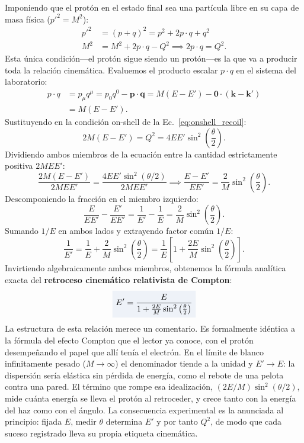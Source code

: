 \documentclass[10pt,a4paper]{article}
\newcommand{\dest}[1]{{\setlength{\fboxsep}{4pt}\colorbox{colordest}{$\displaystyle #1$}}}
\begin{document}
Imponiendo que el protón en el estado final sea una partícula libre en su capa de masa física ($p'^2 = M^2$):
\begin{align}
p'^2 &= (p + q)^2 = p^2 + 2 p \cdot q + q^2 \nonumber \\
M^2 &= M^2 + 2 p \cdot q - Q^2 \implies 2 p \cdot q = Q^2.
\label{eq:onshell_recoil}
\end{align}
Esta única condición---el protón sigue siendo un protón---es la que va a producir toda la relación cinemática. Evaluemos el producto escalar $p \cdot q$ en el sistema del laboratorio:
\begin{align}
p \cdot q &= p_\mu q^\mu = p_0 q^0 - \mathbf{p} \cdot \mathbf{q} = M (E - E') - \mathbf{0} \cdot (\mathbf{k} - \mathbf{k}') \nonumber \\
&= M (E - E').
\end{align}
Sustituyendo en la condición on-shell de la Ec.~\eqref{eq:onshell_recoil}:
\begin{equation}
2 M (E - E') = Q^2 = 4 E E' \sin^2\left(\frac{\theta}{2}\right).
\end{equation}
Dividiendo ambos miembros de la ecuación entre la cantidad estrictamente positiva $2 M E E'$:
\begin{equation}
\frac{2 M (E - E')}{2 M E E'} = \frac{4 E E' \sin^2(\theta/2)}{2 M E E'} \implies \frac{E - E'}{E E'} = \frac{2}{M} \sin^2\left(\frac{\theta}{2}\right).
\end{equation}
Descomponiendo la fracción en el miembro izquierdo:
\begin{equation}
\frac{E}{E E'} - \frac{E'}{E E'} = \frac{1}{E'} - \frac{1}{E} = \frac{2}{M} \sin^2\left(\frac{\theta}{2}\right).
\end{equation}
Sumando $1/E$ en ambos lados y extrayendo factor común $1/E$:
\begin{equation}
\frac{1}{E'} = \frac{1}{E} + \frac{2}{M} \sin^2\left(\frac{\theta}{2}\right) = \frac{1}{E} \left[ 1 + \frac{2E}{M} \sin^2\left(\frac{\theta}{2}\right) \right].
\end{equation}
Invirtiendo algebraicamente ambos miembros, obtenemos la fórmula analítica exacta del \textbf{retroceso cinemático relativista de Compton}:
\begin{equation}
\dest{E' = \frac{E}{1 + \frac{2E}{M} \sin^2\left(\frac{\theta}{2}\right)}}
\label{eq:recoil_energy_exact}
\end{equation}
La estructura de esta relación merece un comentario. Es formalmente idéntica a la fórmula del efecto Compton que el lector ya conoce, con el protón desempeñando el papel que allí tenía el electrón. En el límite de blanco infinitamente pesado ($M \to \infty$) el denominador tiende a la unidad y $E' \to E$: la dispersión sería elástica sin pérdida de energía, como el rebote de una pelota contra una pared. El término que rompe esa idealización, $(2E/M)\sin^2(\theta/2)$, mide cuánta energía se lleva el protón al retroceder, y crece tanto con la energía del haz como con el ángulo. La consecuencia experimental es la anunciada al principio: fijada $E$, medir $\theta$ determina $E'$ y por tanto $Q^2$, de modo que cada suceso registrado lleva su propia etiqueta cinemática.
\end{document}
